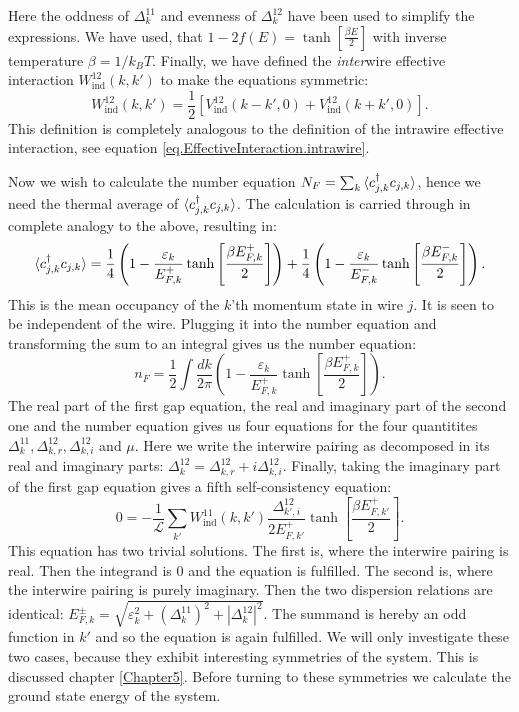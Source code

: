 Here the oddness of $\Delta^{11}_k$ and evenness of $\Delta^{12}_k$ have been used to simplify the expressions. We have used, that $1 - 2f(E) = \tanh\left[\frac{\beta E}{2}\right]$ with inverse temperature $\beta = 1 / k_BT$. Finally, we have defined the \textit{inter}wire effective interaction $W_{\text{ind}}^{12}(k, k')$ to make the equations symmetric:
\begin{equation}
W_{\text{ind}}^{12}(k, k') = \frac{1}{2}\left[V_{\text{ind}}^{12}(k - k', 0) + V_{\text{ind}}^{12}(k + k', 0) \right].
\label{eq.EffectiveInteraction.interwire}
\end{equation}
This definition is completely analogous to the definition of the intrawire effective interaction, see equation \eqref{eq.EffectiveInteraction.intrawire}. 

Now we wish to calculate the number equation $N_F = \sum_k \braket{c^\dagger_{j,k}c_{j,k}}$, hence we need the thermal average of $\braket{c^\dagger_{j,k}c_{j,k}}$. The calculation is carried through in complete analogy to the above, resulting in:
\begin{equation}
\braket{c^\dagger_{j,k}c_{j,k}} = \frac{1}{4}\left( 1 - \frac{\varepsilon_k}{E^{+}_{F,k}}\tanh\left[\frac{\beta E^{+}_{F,k}}{2}\right] \right) + \frac{1}{4}\left( 1 - \frac{\varepsilon_k}{E^{-}_{F,k}}\tanh\left[\frac{\beta E^{-}_{F,k}}{2}\right] \right).
\label{eq.meanoccupancy}
\end{equation}
This is the mean occupancy of the $k$'th momentum state in wire $j$. It is seen to be independent of the wire. Plugging it into the number equation and transforming the sum to an integral gives us the number equation:
\begin{equation}
n_F = \frac{1}{2}\int \frac{dk}{2\pi} \left( 1 - \frac{\varepsilon_k}{E^{+}_{F,k}}\tanh\left[\frac{\beta E^{+}_{F,k}}{2}\right] \right). 
\label{eq.2wiresnumberequation}
\end{equation}
The real part of the first gap equation, the real and imaginary part of the second one and the number equation gives us four equations for the four quantitites $\Delta^{11}_k, \Delta^{12}_{k,r}, \Delta^{12}_{k,i} $ and $\mu$. Here we write the interwire pairing as decomposed in its real and imaginary parts: $\Delta^{12}_k = \Delta^{12}_{k,r} + i\Delta^{12}_{k,i}$. Finally, taking the imaginary part of the first gap equation gives a fifth self-consistency equation:
\begin{equation}
0 = -\frac{1}{\mathcal{L}}\sum_{k'} W_{\text{ind}}^{11}(k, k')\frac{\Delta^{12}_{k',i}}{2E^{+}_{F,k'}}\tanh\left[\frac{\beta E^{+}_{F,k'}}{2}\right].
\end{equation}
This equation has two trivial solutions. The first is, where the interwire pairing is real. Then the integrand is 0 and the equation is fulfilled. The second is, where the interwire pairing is purely imaginary. Then the two dispersion relations are identical: $E^{\pm}_{F,k} = \sqrt{\varepsilon_k^2 + (\Delta^{11}_k)^2 + |\Delta^{12}_k|^2}$. The summand is hereby an odd function in $k'$ and so the equation is again fulfilled. We will only investigate these two cases, because they exhibit interesting symmetries of the system. This is discussed chapter \ref{Chapter5}. Before turning to these symmetries we calculate the ground state energy of the system. 

